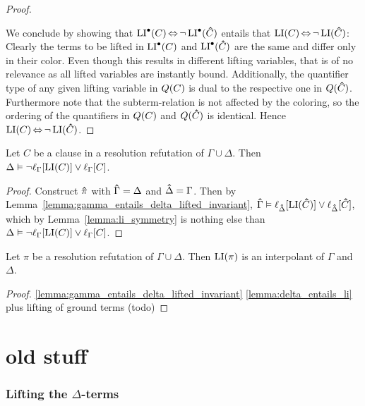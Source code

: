 \documentclass[,%
	draft=false,%
	numbers=noendperiod
	11pt,
	a4paper,
	oneside,%
	openany,
]{memoir}
\begin{document}
\begin{proof}
\begin{itemize}
\begin{itemize}
			\end{itemize}

	\end{itemize}


	We conclude by showing that 
	$\operatorname{LI}^\bullet(C) \operatorname{\Leftrightarrow} \lnot \operatorname{LI}^\bullet(\bm\hat C)$ 
	entails that 
	$\operatorname{LI}(C) \operatorname{\Leftrightarrow} \lnot \operatorname{LI}(\bm\hat C)$:
	Clearly the terms to be lifted in $\operatorname{LI}^\bullet(C)$ and $\operatorname{LI}^\bullet(\bm\hat C)$ are the same and differ only in their color.
	Even though this results in different lifting variables, that is of no relevance as all lifted variables are instantly bound.
	Additionally, the quantifier type of any given lifting variable in $Q(C)$ is dual to the respective one in $Q(\bm\hat C)$.
	Furthermore note that the subterm-relation is not affected by the coloring, so the ordering of the quantifiers in $Q(C)$ and $Q(\bm\hat C)$ is identical.
	Hence 
	$\operatorname{LI}(C) \operatorname{\Leftrightarrow} \lnot \operatorname{LI}(\bm\hat C)$.
\end{proof}


\begin{lemma}
	\label{lemma:delta_entails_li}
	Let $C$ be a clause in a resolution refutation of $\Gamma \cup \Delta$.
	Then
	$\Delta \vDash \lnot\ell_{\Gamma}[\operatorname{LI}(C)] \lor \ell_{\Gamma}[C]$.
\end{lemma}
\begin{proof}
	Construct $\bm\hat \pi$ with $\bm\hat \Gamma = \Delta$ and $\bm\hat \Delta = \Gamma$. 
	Then by Lemma~\ref{lemma:gamma_entails_delta_lifted_invariant}, $\bm\hat \Gamma \vDash \ell_{\bm\hat \Delta}[\operatorname{LI}(\bm\hat C)] \lor \ell_{\bm\hat \Delta}[\bm\hat C]$, 
	which by Lemma~\ref{lemma:li_symmetry} is nothing else than
	$\Delta \vDash \lnot \ell_{\Gamma}[\operatorname{LI}(C)] \lor \ell_{\Gamma}[C]$.
\end{proof}

\begin{thm}
	Let $\pi$ be a resolution refutation of $\Gamma \cup \Delta$.
	Then $\operatorname{LI}(\pi)$ is an interpolant of $\Gamma$ and $\Delta$.
\end{thm}
\begin{proof}
	\ref{lemma:gamma_entails_delta_lifted_invariant}
	\ref{lemma:delta_entails_li}
	plus lifting of ground terms (todo)

\end{proof}


\part*{old stuff}

\section{Lifting the $\Delta$-terms}
\end{document}
